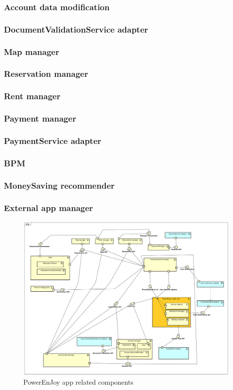 \documentclass[english]{article}
\begin{document}
		\subsubsection{Account data modification }
	\subsubsection{DocumentValidationService adapter}
	
	\subsubsection{Map manager}
	\subsubsection{Reservation manager}
	\subsubsection{Rent manager}
	
	\subsubsection{Payment manager}
	\subsubsection{PaymentService adapter}
	
	\subsubsection{BPM}
		\subsubsection{MoneySaving recommender }
	
	\subsubsection{External app manager}
	\begin{figure}[H]
		\centering
		\includegraphics[scale=0.26]{./ComponentDiagrams/PowerEnjoyuser.pdf}%
		\caption{PowerEnJoy app related components}
	\end{figure}
	
\end{document}
